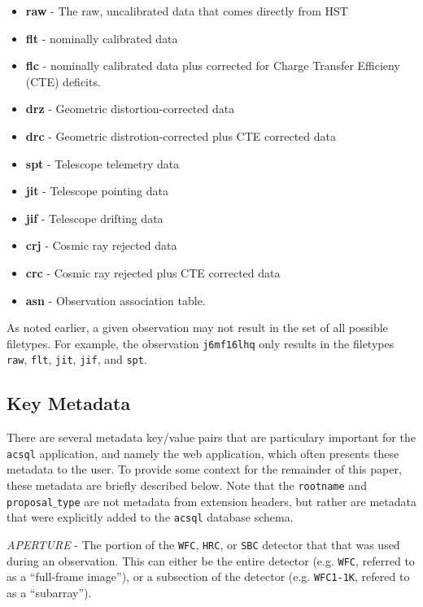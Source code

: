 \documentclass[10pt,journal,compsoc]{IEEEtran}
\begin{document}
\begin{itemize}
  \item \textbf{raw} - The raw, uncalibrated data that comes directly from HST
  \item \textbf{flt} - nominally calibrated data
  \item \textbf{flc} - nominally calibrated data plus corrected for Charge Transfer Efficieny (CTE) deficits.
  \item \textbf{drz} - Geometric distortion-corrected data
  \item \textbf{drc} - Geometric distrotion-corrected plus CTE corrected data
  \item \textbf{spt} - Telescope telemetry data
  \item \textbf{jit} - Telescope pointing data
  \item \textbf{jif} - Telescope drifting data
  \item \textbf{crj} - Cosmic ray rejected data
  \item \textbf{crc} - Cosmic ray rejected plus CTE corrected data
  \item \textbf{asn} - Observation association table.
\end{itemize}

As noted earlier, a given observation may not result in the set of all possible filetypes. For example, the observation \texttt{j6mf16lhq} only results in the
filetypes \texttt{raw}, \texttt{flt}, \texttt{jit}, \texttt{jif}, and \texttt{spt}.


\subsection{Key Metadata} \label{sec1.2}

There are several metadata key/value pairs that are particulary important for the \texttt{acsql} application, and namely the web application, which often
presents these metadata to the user.  To provide some context for the remainder of this paper, these metadata are briefly described below.  Note that the
\texttt{rootname} and \texttt{proposal$\_$type} are not metadata from extension headers, but rather are metadata that were explicitly added to the
\texttt{acsql} database schema.\newline

\textit{APERTURE} - The portion of the \texttt{WFC}, \texttt{HRC}, or \texttt{SBC} detector that that was used during an observation.  This can either be the
entire detector (e.g. \texttt{WFC}, referred to as a ``full-frame image''), or a subsection of the detector (e.g. \texttt{WFC1-1K}, refered to as a ``subarray'').\\
\end{document}
